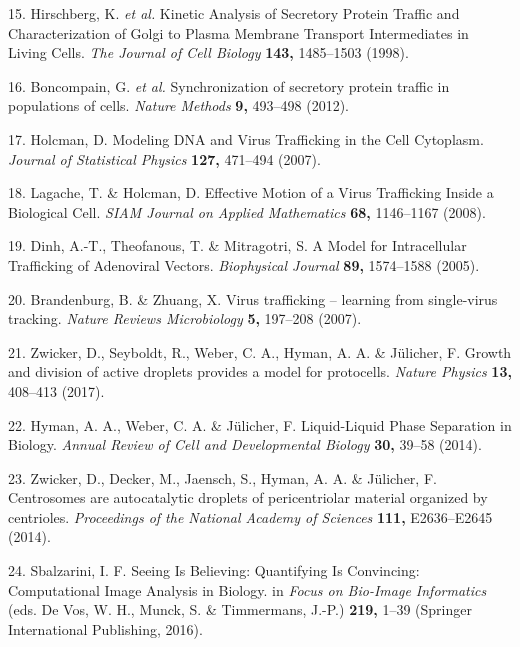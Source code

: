 \documentclass{Dissertate}
\begin{document}
\leavevmode\hypertarget{ref-hirschberg_kinetic_1998}{}%
15. Hirschberg, K. \emph{et al.} Kinetic Analysis of Secretory Protein
Traffic and Characterization of Golgi to Plasma Membrane Transport
Intermediates in Living Cells. \emph{The Journal of Cell Biology}
\textbf{143,} 1485--1503 (1998).

\leavevmode\hypertarget{ref-boncompain_synchronization_2012}{}%
16. Boncompain, G. \emph{et al.} Synchronization of secretory protein
traffic in populations of cells. \emph{Nature Methods} \textbf{9,}
493--498 (2012).

\leavevmode\hypertarget{ref-holcman_modeling_2007}{}%
17. Holcman, D. Modeling DNA and Virus Trafficking in the Cell
Cytoplasm. \emph{Journal of Statistical Physics} \textbf{127,} 471--494
(2007).

\leavevmode\hypertarget{ref-lagache_effective_2008}{}%
18. Lagache, T. \& Holcman, D. Effective Motion of a Virus Trafficking
Inside a Biological Cell. \emph{SIAM Journal on Applied Mathematics}
\textbf{68,} 1146--1167 (2008).

\leavevmode\hypertarget{ref-dinh_model_2005}{}%
19. Dinh, A.-T., Theofanous, T. \& Mitragotri, S. A Model for
Intracellular Trafficking of Adenoviral Vectors. \emph{Biophysical
Journal} \textbf{89,} 1574--1588 (2005).

\leavevmode\hypertarget{ref-brandenburg_virus_2007}{}%
20. Brandenburg, B. \& Zhuang, X. Virus trafficking -- learning from
single-virus tracking. \emph{Nature Reviews Microbiology} \textbf{5,}
197--208 (2007).

\leavevmode\hypertarget{ref-zwicker_growth_2017}{}%
21. Zwicker, D., Seyboldt, R., Weber, C. A., Hyman, A. A. \& Jülicher,
F. Growth and division of active droplets provides a model for
protocells. \emph{Nature Physics} \textbf{13,} 408--413 (2017).

\leavevmode\hypertarget{ref-hyman_liquid-liquid_2014}{}%
22. Hyman, A. A., Weber, C. A. \& Jülicher, F. Liquid-Liquid Phase
Separation in Biology. \emph{Annual Review of Cell and Developmental
Biology} \textbf{30,} 39--58 (2014).

\leavevmode\hypertarget{ref-zwicker_centrosomes_2014}{}%
23. Zwicker, D., Decker, M., Jaensch, S., Hyman, A. A. \& Jülicher, F.
Centrosomes are autocatalytic droplets of pericentriolar material
organized by centrioles. \emph{Proceedings of the National Academy of
Sciences} \textbf{111,} E2636--E2645 (2014).

\leavevmode\hypertarget{ref-de_vos_seeing_2016}{}%
24. Sbalzarini, I. F. Seeing Is Believing: Quantifying Is Convincing:
Computational Image Analysis in Biology. in \emph{Focus on Bio-Image
Informatics} (eds. De Vos, W. H., Munck, S. \& Timmermans, J.-P.)
\textbf{219,} 1--39 (Springer International Publishing, 2016).
\end{document}

